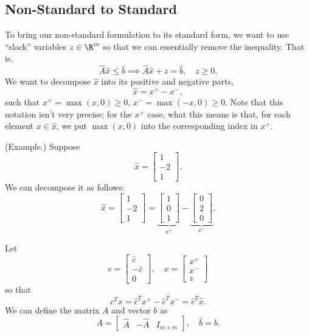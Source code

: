 \documentclass[letterpaper]{article}
\begin{document}
\subsection{Non-Standard to Standard}
To bring our non-standard formulation to its standard form, we want to use ``slack'' variables $z \in \R^m$ so that we can essentially remove the inequality. That is, 
\[\hat{A}\hat{x} \leq \hat{b} \implies \hat{A} \hat{x} + z = \hat{b}, \quad z \geq 0.\]
We want to decompose $\hat{x}$ into its positive and negative parts, 
\[\hat{x} = x^+ - x^-,\]
such that $x^+ = \max(x, 0) \geq 0$, $x^- = \max(-x, 0) \geq 0$. Note that this notation isn't very precise; for the $x^+$ case, what this means is that, for each element $x \in \hat{x}$, we put $\max(x, 0)$ into the corresponding index in $x^+$. 

\begin{mdframed}
    (Example.) Suppose \[\hat{x} = \begin{bmatrix}
        1 \\ -2 \\ 1
    \end{bmatrix}.\] We can decompose it as follows: 
    \[\hat{x} = \begin{bmatrix}
        1 \\ -2 \\ 1
    \end{bmatrix} = \underbrace{\begin{bmatrix}
        1 \\ 0 \\ 1
    \end{bmatrix}}_{x^+} - \underbrace{\begin{bmatrix}
        0 \\ 2 \\ 0
    \end{bmatrix}}_{x^-}.\]
\end{mdframed}
Let 
\[c = \begin{bmatrix}
    \hat{c} \\ -\hat{c} \\ 0
\end{bmatrix}, \quad x = \begin{bmatrix}
    x^+ \\ x^- \\ z
\end{bmatrix}\]
so that 
\[c^T x = \hat{c}^T x^+ - \hat{c}^T x^- = \hat{c}^T \hat{x}.\]
We can define the matrix $A$ and vector $b$ as 
\[A = \begin{bmatrix}
    \hat{A} & -\hat{A} & I_{m \times m}
\end{bmatrix}, \quad \hat{b} = b.\]
\end{document}
